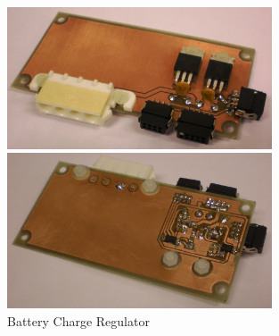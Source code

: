 \begin{figure}[H]
\begin{minipage}[t]{\linewidth}
\centering
\includegraphics[width=0.7\textwidth]{figures/fig_SAR_top}
\end{minipage}
\vspace{2mm}
\begin{minipage}[t]{\linewidth}
\centering
\includegraphics[width=0.7\textwidth]{figures/fig_SAR_bottom}
\end{minipage}
\caption{Battery Charge Regulator}
\label{fig:SAR_top_bottom}
\end{figure}

